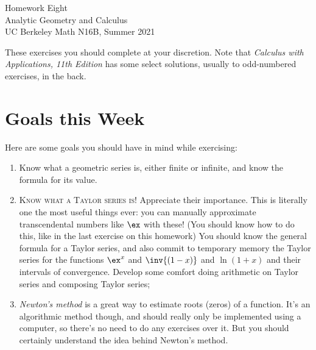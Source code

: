 

\usepackage{fourier}



\pagestyle{empty}




\begin{center}
    {\Huge{Homework Eight}}
    \\ \footnotesize{Analytic Geometry and Calculus}
    \\ \footnotesize{UC Berkeley Math N16B, Summer 2021}
\end{center}
\vspace{2em}

These exercises you should complete at your discretion.
Note that \emph{Calculus with Applications, 11th Edition} 
has some select solutions, usually to odd-numbered exercises, in the back.


\section*{Goals this Week}

Here are some goals you should have in mind while exercising:
\begin{enumerate}
    \item 
        Know what a geometric series is, either finite or infinite, 
        and know the formula for its value.

    \item 
        \textsc{Know what a Taylor series is}!
        Appreciate their importance.
        This is literally one the most useful things ever:
        you can manually approximate transcendental numbers like $\ex$ with these!
        (You should know how to do this, like in the last exercise 
        on this homework)
        You should know the general formula for a Taylor series,
        and also commit to temporary memory the Taylor series for
        the functions $\ex^x$ and $\inv{(1-x)}$ and $\ln(1+x)$
        and their intervals of convergence.
        Develop some comfort doing arithmetic on Taylor series
        and composing Taylor series; 

    \item 
        \emph{Newton's method} is a great way to estimate roots (zeros)
        of a function. It's an algorithmic method though,
        and should really only be implemented using a computer,
        so there's no need to do any exercises over it.
        But you should certainly understand the idea behind Newton's method.

\end{enumerate}

